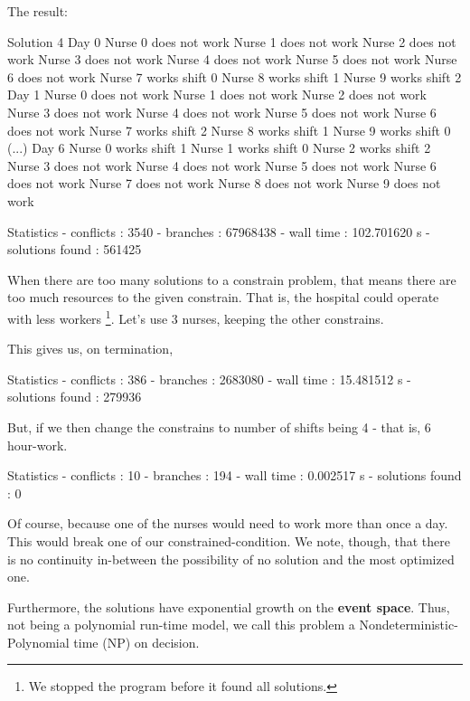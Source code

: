 \documentclass[
12pt,				%
openright,			%
oneside,			%
a4paper,			%
brazil,				%
english,			  %
]{abntex2}
\begin{document}
The result:
\begin{python}
Solution 4
Day 0
  Nurse 0 does not work
  Nurse 1 does not work
  Nurse 2 does not work
  Nurse 3 does not work
  Nurse 4 does not work
  Nurse 5 does not work
  Nurse 6 does not work
  Nurse 7 works shift 0
  Nurse 8 works shift 1
  Nurse 9 works shift 2
Day 1
  Nurse 0 does not work
  Nurse 1 does not work
  Nurse 2 does not work
  Nurse 3 does not work
  Nurse 4 does not work
  Nurse 5 does not work
  Nurse 6 does not work
  Nurse 7 works shift 2
  Nurse 8 works shift 1
  Nurse 9 works shift 0
(...)
Day 6
  Nurse 0 works shift 1
  Nurse 1 works shift 0
  Nurse 2 works shift 2
  Nurse 3 does not work
  Nurse 4 does not work
  Nurse 5 does not work
  Nurse 6 does not work
  Nurse 7 does not work
  Nurse 8 does not work
  Nurse 9 does not work

Statistics
  - conflicts       : 3540
  - branches        : 67968438
  - wall time       : 102.701620 s
  - solutions found : 561425
\end{python}

When there are too many solutions to a constrain problem, that means
there are too much resources to the given constrain. That is, the
hospital could operate with less workers \footnote{We stopped the
  program before it found all solutions.}. Let's use 3 nurses, keeping
the other constrains.

This gives us, on termination,
\begin{python}
Statistics
  - conflicts       : 386
  - branches        : 2683080
  - wall time       : 15.481512 s
  - solutions found : 279936
\end{python}

But, if we then change the constrains to number of shifts being 4 -
that is, 6 hour-work.

\begin{python}
Statistics
  - conflicts       : 10
  - branches        : 194
  - wall time       : 0.002517 s
  - solutions found : 0
\end{python}
Of course, because one of the nurses would need to work more than once
a day. This would break one of our constrained-condition. We note, though, that there is no continuity in-between the possibility of no solution and the most optimized one. 

Furthermore, the solutions have exponential growth on the \textbf{event space}. Thus, not being a polynomial run-time model, we call this problem a Nondeterministic-Polynomial time (NP) on decision.
\end{document}
